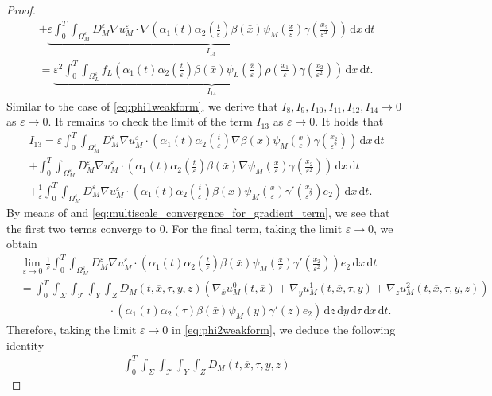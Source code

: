\documentclass[10pt,a4paper]{amsart}
\def\T{\mathcal{T}}
\newcommand{\di}[1]{\,\mathrm{d}#1}
\def\es{\varepsilon}
\def\oll{\Omega_L^\varepsilon}
\def\omm{\Omega_M^\varepsilon}
\begin{document}
\begin{proof}
\begin{multline}
    +\underbrace{ \es\int_0^T\int_{\omm}  D_M^\es  \nabla u_M^\es\cdot\nabla (\alpha_1(t)\alpha_2(\frac{t}{\es})\beta(\bar x) \psi_M(\frac{x}{\es})\gamma(\frac{x_2}{\es^2})) \di{x}\di{t}}_{I_{13}}\\
    = \underbrace{\es^2 \int_0^T\int_{\oll} f_L(\alpha_1(t)\alpha_2(\frac{t}{\es})\beta(\bar x) \psi_L(\frac{\bar x}{\es})\rho(\frac{x_1}{\es})\gamma(\frac{x_2}{\es^2})) \di{x}\di{t}}_{I_{14}}.
\end{multline}
Similar to the case of \eqref{eq:phi1weakform}, we derive that $I_8,I_9,I_{10},I_{11},I_{12},I_{14}\rightarrow 0$ as $\es\rightarrow 0$. It remains to check the limit of the term $I_{13}$ as $\es\rightarrow 0$.  It holds that
\begin{multline*}
    I_{13}= \es\int_0^T\int_{\omm}  D_M^\es  \nabla u_M^\es\cdot (\alpha_1(t)\alpha_2(\frac{t}{\es})\nabla\beta(\bar x) \psi_M(\frac{x}{\es})\gamma(\frac{x_2}{\es^2})) \di{x}\di{t}\\
    +\int_0^T\int_{\omm}  D_M^\es  \nabla u_M^\es\cdot (\alpha_1(t)\alpha_2(\frac{t}{\es})\beta(\bar x) \nabla\psi_M(\frac{x}{\es})\gamma(\frac{x_2}{\es^2})) \di{x}\di{t}\\
    +\frac1\es\int_0^T\int_{\omm}  D_M^\es  \nabla u_M^\es\cdot (\alpha_1(t)\alpha_2(\frac{t}{\es})\beta(\bar x) \psi_M(\frac{x}{\es})\gamma'(\frac{x_2}{\es^2})e_2) \di{x}\di{t}.
\end{multline*}
By means of  and \eqref{eq:multiscale_convergence_for_gradient_term}, we see that the first two terms converge to $0$. For the final term, taking the limit $\es\rightarrow 0$, we obtain
\begin{align*}
    &\!\!\!\!\lim_{\es\rightarrow 0}\frac1\es\int_0^T\int_{\omm}  D_M^\es  \nabla u_M^\es\cdot (\alpha_1(t)\alpha_2(\frac{t}{\es})\beta(\bar x) \psi_M(\frac{x}{\es})\gamma'(\frac{x_2}{\es^2})) e_2\di{x}\di{t}\\
    &=\int_0^T\int_{\Sigma}\int_\T\int_{Y}\int_Z   D_M(t,\overline{x},\tau,y,z)
    \left( \nabla_{\overline{x}}u_M^0(t,\overline{x})+\nabla_y u_M^1(t,\overline{x},\tau,y)+\nabla_zu_M^2(t,\overline{x},\tau,y,z)\right)\\
    &\qquad\qquad\qquad\qquad \cdot ( \alpha_1(t)\alpha_2(\tau)\beta(\bar x) \psi_M(y)\gamma'(z)e_2) \di{z}\di{y}\di{\tau}\di{x}\di{t}.
\end{align*}
Therefore, taking the limit $\es\rightarrow 0$ in \eqref{eq:phi2weakform}, we deduce the following identity
\begin{multline*}
    \int_0^T\int_{\Sigma}\int_\T\int_{Y}\int_Z   D_M(t,\overline{x},\tau,y,z)

\end{multline*}
\end{proof}
\end{document}
